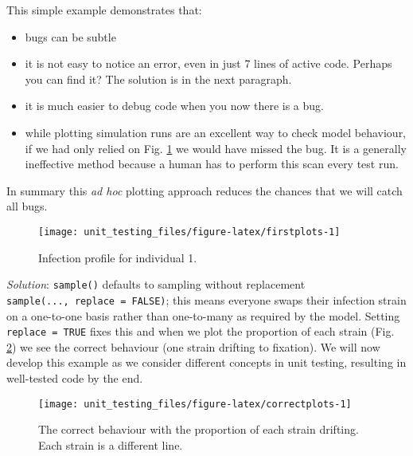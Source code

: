 \documentclass[10pt,letterpaper]{article}
\providecommand{\tightlist}{%
  \setlength{\itemsep}{0pt}\setlength{\parskip}{0pt}}
\begin{document}
This simple example demonstrates that:

\begin{itemize}
\tightlist
\item
  bugs can be subtle
\item
  it is not easy to notice an error, even in just 7 lines of active code. Perhaps you can find it? The solution is in the next paragraph.
\item
  it is much easier to debug code when you now there is a bug.
\item
  while plotting simulation runs are an excellent way to check model behaviour, if we had only relied on Fig. \ref{fig:firstplots} we would have missed the bug. It is a generally ineffective method because a human has to perform this scan every test run.
\end{itemize}

In summary this \emph{ad hoc} plotting approach reduces the chances that we will catch all bugs.

\begin{figure}[h]

{\centering \texttt{[image: unit\_testing\_files/figure-latex/firstplots-1]} 

}

\caption{Infection profile for individual 1.}\label{fig:firstplots}
\end{figure}

\emph{Solution}: \texttt{sample()} defaults to sampling without replacement \texttt{sample(...,\ replace\ =\ FALSE)}; this means everyone swaps their infection strain on a one-to-one basis rather than one-to-many as required by the model.
Setting \texttt{replace\ =\ TRUE} fixes this and when we plot the proportion of each strain (Fig. \ref{fig:correctplots}) we see the correct behaviour (one strain drifting to fixation).
We will now develop this example as we consider different concepts in unit testing, resulting in well-tested code by the end.
\newline

\begin{figure}[h]

{\centering \texttt{[image: unit\_testing\_files/figure-latex/correctplots-1]} 

}

\caption{The correct behaviour with the proportion of each strain drifting. Each strain is a different line.}\label{fig:correctplots}
\end{figure}
\end{document}
